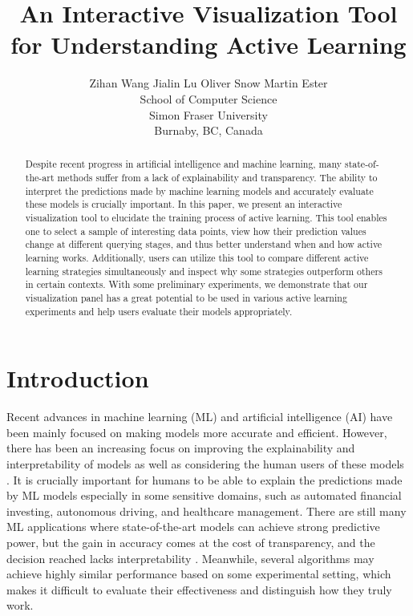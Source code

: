 \documentclass{article}
\title{An Interactive Visualization Tool for Understanding Active Learning}
\author{%
  Zihan Wang 
  \qquad Jialin Lu 
  \qquad Oliver Snow 
  \qquad Martin Ester \\
  School of Computer Science\\
  Simon Fraser University\\
  Burnaby, BC, Canada \\
}
\begin{document}
\maketitle

\begin{abstract}
Despite recent progress in artificial intelligence and machine learning, many state-of-the-art methods suffer from a lack of explainability and transparency. The ability to interpret the predictions made by machine learning models and accurately evaluate these models is crucially important. In this paper, we present an interactive visualization tool to elucidate the training process of active learning. This tool enables one to select a sample of interesting data points, view how their prediction values change at different querying stages, and thus better understand when and how active learning works. Additionally, users can utilize this tool to compare different active learning strategies simultaneously and inspect why some strategies outperform others in certain contexts. With some preliminary experiments, we demonstrate that our visualization panel has a great potential to be used in various active learning experiments and help users evaluate their models appropriately. 
\end{abstract}


\section{Introduction}

Recent advances in machine learning (ML) and artificial intelligence (AI) have been mainly focused on making models more accurate and efficient. However, there has been an increasing focus on improving the explainability and interpretability of models as well as considering the human users of these models \citep{schmidt2020interactive}. It is crucially important for humans to be able to explain the predictions made by ML models especially in some sensitive domains, such as automated financial investing, autonomous driving, and healthcare management. There are still many ML applications where state-of-the-art models can achieve strong predictive power, but the gain in accuracy comes at the cost of transparency, and the decision reached lacks interpretability \citep{mononet}. Meanwhile, several algorithms may achieve highly similar performance based on some experimental setting, which makes it difficult to evaluate their effectiveness and distinguish how they truly work. 
\end{document}
